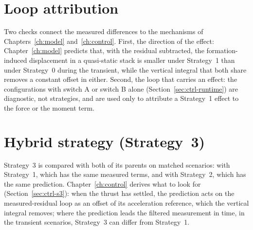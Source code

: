 \section{Loop attribution}
\label{sec:res2-attribution}

Two checks connect the measured differences to the mechanisms of Chapters~\ref{ch:model}
and~\ref{ch:control}. First, the direction of the effect: Chapter~\ref{ch:model} predicts that, with
the residual subtracted, the formation-induced displacement in a quasi-static stack is smaller under
Strategy~1 than under Strategy~0 during the transient, while the vertical integral that both share
removes a constant offset in either. Second, the loop that carries an effect: the configurations
with switch A or switch B alone (Section~\ref{sec:ctrl-runtime}) are diagnostic, not strategies,
and are used only to attribute a Strategy~1 effect to the force or the moment term.


\section{Hybrid strategy (Strategy~3)}
\label{sec:res2-hybrid}

Strategy~3 is compared with both of its parents on matched scenarios: with Strategy~1, which has the
same measured terms, and with Strategy~2, which has the same prediction. Chapter~\ref{ch:control}
derives what to look for (Section~\ref{sec:ctrl-s3}): when the thrust has settled, the prediction
acts on the measured-residual loop as an offset of its acceleration reference, which the vertical
integral removes; where the prediction leads the filtered measurement in time, in the transient
scenarios, Strategy~3 can differ from Strategy~1.


